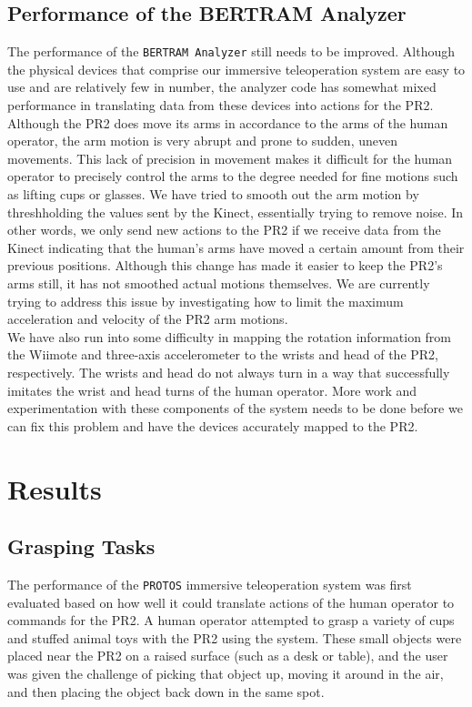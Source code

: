 \documentclass{sig-alternate}
\begin{document}
\subsection {Performance of the BERTRAM Analyzer}
\indent The performance of the {\tt BERTRAM Analyzer} still needs to be improved. Although the physical devices that comprise our immersive teleoperation system are easy to use and are relatively few in number, the analyzer code has somewhat mixed performance in translating data from these devices into actions for the PR2. Although the PR2 does move its arms in accordance to the arms of the human operator, the arm motion is very abrupt and prone to sudden, uneven movements. This lack of precision in movement makes it difficult for the human operator to precisely control the arms to the degree needed for fine motions such as lifting cups or glasses. We have tried to smooth out the arm motion by threshholding the values sent by the Kinect, essentially trying to remove noise. In other words, we only send new actions to the PR2 if we receive data from the Kinect indicating that the human's arms have moved a certain amount from their previous positions. Although this change has made it easier to keep the PR2's arms still, it has not smoothed actual motions themselves. We are currently trying to address this issue by investigating how to limit the maximum acceleration and velocity of the PR2 arm motions.\\
\indent We have also run into some difficulty in mapping the rotation information from the Wiimote and three-axis accelerometer to the wrists and head of the PR2, respectively. The wrists and head do not always turn in a way that successfully imitates the wrist and head turns of the human operator. More work and experimentation with these components of the system needs to be done before we can fix this problem and have the devices accurately mapped to the PR2.

\section{Results}
\label{sec:results}

\subsection{Grasping Tasks}
\indent The performance of the {\tt PROTOS} immersive teleoperation system was first
evaluated based on how well it could translate actions of
the human operator to commands for the PR2. A human operator attempted to grasp a variety of cups and stuffed animal toys 
with the PR2 using the system. These small objects were placed near the PR2 on a raised surface (such as a desk or table), and the user was given the challenge of
picking that object up, moving it around in the air, and then placing the object back down in the same spot.
\end{document}
